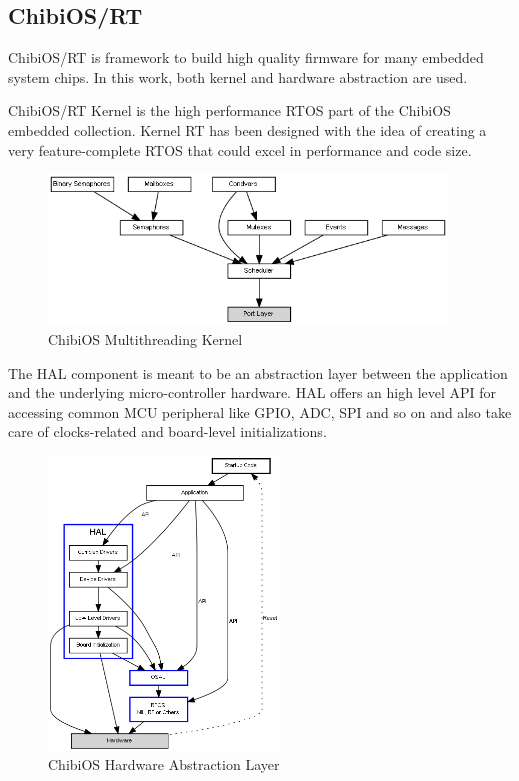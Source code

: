 \documentclass[12pt,]{book}
\begin{document}
	\subsection{ChibiOS/RT}
	ChibiOS/RT is framework to build high quality firmware for many embedded system chips.
	In this work, both kernel and hardware abstraction are used.
	
	ChibiOS/RT Kernel is the high performance RTOS part of the ChibiOS embedded collection.
	Kernel RT has been designed with the idea of creating a very feature-complete RTOS that could excel in performance and code size.
	
	\begin{figure}[h]
		\centering
		\includegraphics[width=300pt]{images/chibios_kernel}
		\caption{ChibiOS Multithreading Kernel}
	\end{figure}
	
	\newpage
	The HAL component is meant to be an abstraction layer between the application and the underlying micro-controller hardware.
	HAL offers an high level API for accessing common MCU peripheral like GPIO, ADC, SPI and so on and also take care of clocks-related and board-level initializations.
	
	\begin{figure}[H]
		\centering
		\includegraphics[width=175pt]{images/chibios_hal_arch}
		\caption{ChibiOS Hardware Abstraction Layer}
	\end{figure}
\end{document}
